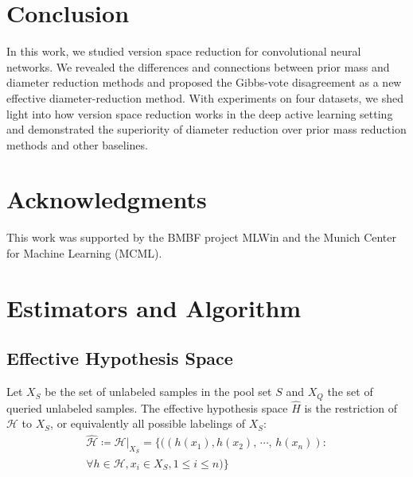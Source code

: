 \documentclass[runningheads, envcountsame, a4paper]{llncs}
\begin{document}
\section{Conclusion}
\label{sec:conclusion}
In this work, we studied version space reduction for convolutional neural networks. We revealed the differences and connections between prior mass and diameter reduction methods and proposed the Gibbs-vote disagreement as a new effective diameter-reduction method. With experiments on four datasets, we shed light into how version space reduction works in the deep active learning setting and demonstrated the superiority of diameter reduction over prior mass reduction methods and other baselines.




\section*{Acknowledgments}
This work was supported by the BMBF project MLWin and the Munich Center for Machine Learning (MCML).

\clearpage



\appendix

\section{Estimators and Algorithm}


\subsection{Effective Hypothesis Space}
Let $X_S$ be the set of unlabeled samples in the pool set $S$ and $X_Q$ the set of queried unlabeled samples. The effective hypothesis space $\hat{H}$ is the restriction of $\mathcal{H}$ to $X_S$, or equivalently all possible labelings of $X_S$: 
\begin{multline}
    \hat{\mathcal{H}} \coloneqq \mathcal{H}|_{X_S} = \{ ((h(x_1), h(x_2),\, \cdots,\, h(x_n)): \\
    \forall h \in \mathcal{H}, x_i \in X_S, 1\le i \le n) \}
\end{multline}
\end{document}
